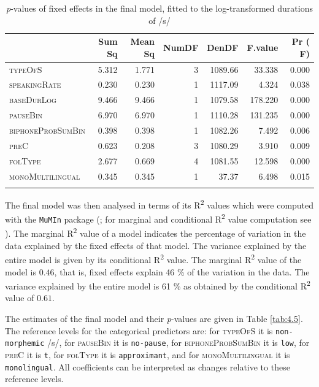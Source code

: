 \begin{table}\fontsize{10}{11}
\caption{\textit{p}-values of fixed effects in the final model, fitted to the log-transformed durations of /s/}
\label{tab:4.4}
\centering
\begin{tabular}{lrrrrrr} 
\lsptoprule
~                 & Sum Sq & Mean Sq & NumDF & DenDF   & F.value & Pr ( F)  \\ 
\midrule
\textsc{typeOfS}           & 5.312  & 1.771   & 3     & 1089.66 & 33.338  & 0.000    \\
\textsc{speakingRate}      & 0.230  & 0.230   & 1     & 1117.09 & 4.324   & 0.038    \\
\textsc{baseDurLog}        & 9.466  & 9.466   & 1     & 1079.58 & 178.220 & 0.000    \\
\textsc{pauseBin}          & 6.970  & 6.970   & 1     & 1110.28 & 131.235 & 0.000    \\
\textsc{biphoneProbSumBin} & 0.398  & 0.398   & 1     & 1082.26 & 7.492   & 0.006    \\
\textsc{preC}              & 0.623  & 0.208   & 3     & 1080.29 & 3.910   & 0.009    \\
\textsc{folType}           & 2.677  & 0.669   & 4     & 1081.55 & 12.598  & 0.000    \\
\textsc{monoMultilingual}  & 0.345  & 0.345   & 1     & 37.37   & 6.498   & 0.015    \\
\lspbottomrule
\end{tabular}
\end{table}

The final model was then analysed in terms of its R\textsuperscript{2} values which were computed with the \texttt{MuMIn} package (\cite{Barton2020}; for marginal and conditional R\textsuperscript{2} value computation see \cite{Nakagawa2017}). The marginal R\textsuperscript{2} value of a model indicates the percentage of variation in the data explained by the fixed effects of that model. The variance explained by the entire model is given by its conditional R\textsuperscript{2} value. The marginal R\textsuperscript{2} value of the model is $0.46$, that is, fixed effects explain 46 \% of the variation in the data. The variance explained by the entire model is 61 \% as obtained by the conditional R\textsuperscript{2} value of $0.61$.

The estimates of the final model and their \textit{p}-values are given in Table \ref{tab:4.5}. The reference levels for the categorical predictors are: for \textsc{typeOfS} it is \texttt{non-morphemic} /s/, for \textsc{pauseBin} it is \texttt{no-pause}, for \textsc{biphoneProbSumBin} it is \texttt{low}, for \textsc{preC} it is \texttt{t}, for \textsc{folType} it is \texttt{approximant}, and for \textsc{monoMultilingual} it is \texttt{monolingual}. All coefficients can be interpreted as changes relative to these reference levels.


